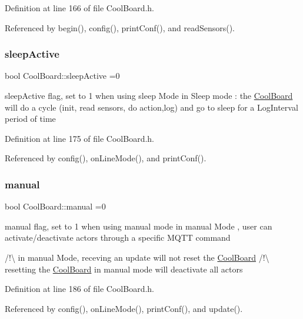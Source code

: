 Definition at line 166 of file Cool\+Board.\+h.



Referenced by begin(), config(), print\+Conf(), and read\+Sensors().

\mbox{\label{class_cool_board_a0a51b2287139f66c738101fb53139230}} 
\subsubsection{\texorpdfstring{sleep\+Active}{sleepActive}}
{\footnotesize\ttfamily bool Cool\+Board\+::sleep\+Active =0\hspace{0.3cm}{\ttfamily [private]}}

sleep\+Active flag, set to 1 when using sleep Mode in Sleep mode \+: the \hyperlink{class_cool_board}{Cool\+Board} will do a cycle (init, read sensors, do action,log) and go to sleep for a Log\+Interval period of time 

Definition at line 175 of file Cool\+Board.\+h.



Referenced by config(), on\+Line\+Mode(), and print\+Conf().

\mbox{\label{class_cool_board_a7c8e505a5804b109e112d5a03df6ea2b}} 
\subsubsection{\texorpdfstring{manual}{manual}}
{\footnotesize\ttfamily bool Cool\+Board\+::manual =0\hspace{0.3cm}{\ttfamily [private]}}

manual flag, set to 1 when using manual mode in manual Mode , user can activate/deactivate actors through a specific M\+Q\+TT command

/!\textbackslash{} in manual Mode, receving an update will not reset the \hyperlink{class_cool_board}{Cool\+Board} /!\textbackslash{} resetting the \hyperlink{class_cool_board}{Cool\+Board} in manual mode will deactivate all actors 

Definition at line 186 of file Cool\+Board.\+h.



Referenced by config(), on\+Line\+Mode(), print\+Conf(), and update().

